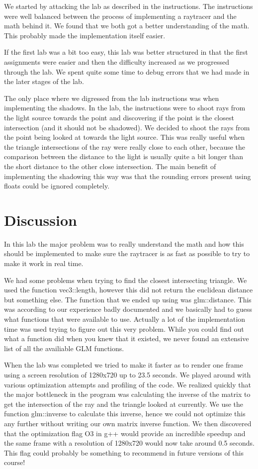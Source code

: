 \documentclass[a4paper]{article}
\begin{document}
We started by attacking the lab as described in the instructions. The
instructions were well balanced between the process of implementing a raytracer
and the math behind it. We found that we both got a better understanding of the
math. This probably made the implementation itself easier.

If the first lab was a bit too easy, this lab was better structured in that the
first assignments were easier and then the difficulty increased as we progressed
through the lab. We spent quite some time to debug errors that we had made in
the later stages of the lab.

The only place where we digressed from the lab instructions was when
implementing the shadows. In the lab, the instructions were to shoot rays from
the light source towards the point and discovering if the point is the closest
intersection (and it should not be shadowed). We decided to shoot the rays from
the point being looked at towards the light source. This was really useful
when the triangle intersections of the ray were really close to each other,
because the comparison between the distance to the light is usually
quite a bit longer than the short distance to the other close intersection. The
main benefit of implementing the shadowing this way was that the rounding errors
present using floats could be ignored completely.

\section{Discussion}
In this lab the major problem was to really understand the math and how this
should be implemented to make sure the raytracer is as fast as possible to try
to make it work in real time.

We had some problems when trying to find the closest intersecting triangle. We
used the function vec3::length, however this did not return the euclidean
distance but something else. The function that we ended up using was
glm::distance. This was according to our experience badly documented and we
basically had to guess what functions that were available to use. Actually a
lot of the implementation time was used trying to figure out this very problem.
While you could find out what a function did when you knew that it existed, we
never found an extensive list of all the availiable GLM functions.

When the lab was completed we tried to make it faster as to render one frame
using a screen resolution of 1280x720 up to 23.5 seconds. We played around with
various optimization attempts and profiling of the code. We realized quickly
that the major bottleneck in the program was calculating the inverse of the
matrix to get the intersection of the ray and the triangle looked at currently.
We use the function glm::inverse to calculate this inverse, hence we could not
optimize this any further without writing our own matrix inverse function. We
then discovered that the optimization flag O3 in g++ would provide an incredible
speedup and the same frame with a resolution of 1280x720 would now take around 0.5
seconds. This flag could probably be something to recommend in future versions
of this course!
\end{document}
